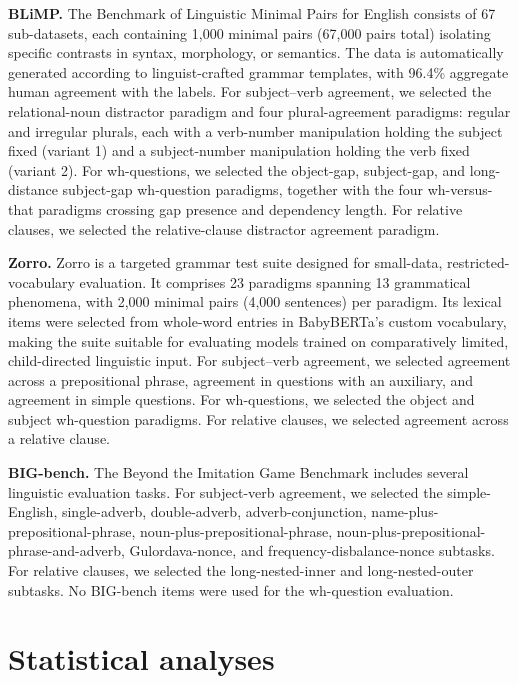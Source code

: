 \textbf{BLiMP.} The Benchmark of Linguistic Minimal Pairs for English \citep{warstadt2020blimp} consists of 67 sub-datasets, each containing 1,000 minimal pairs (67,000 pairs total) isolating specific contrasts in syntax, morphology, or semantics. The data is automatically generated according to linguist-crafted grammar templates, with 96.4\% aggregate human agreement with the labels. For subject--verb agreement, we selected the relational-noun distractor paradigm and four plural-agreement paradigms: regular and irregular plurals, each with a verb-number manipulation holding the subject fixed (variant 1) and a subject-number manipulation holding the verb fixed (variant 2). For wh-questions, we selected the object-gap, subject-gap, and long-distance subject-gap wh-question paradigms, together with the four wh-versus-that paradigms crossing gap presence and dependency length. For relative clauses, we selected the relative-clause distractor agreement paradigm.

 
\textbf{Zorro.} Zorro \citep{huebner2021babyberta} is a targeted grammar test suite designed for small-data, restricted-vocabulary evaluation. It comprises 23 paradigms spanning 13 grammatical phenomena, with 2,000 minimal pairs (4,000 sentences) per paradigm. Its lexical items were selected from whole-word entries in BabyBERTa's custom vocabulary, making the suite suitable for evaluating models trained on comparatively limited, child-directed linguistic input. For subject--verb agreement, we selected agreement across a prepositional phrase, agreement in questions with an auxiliary, and agreement in simple questions. For wh-questions, we selected the object and subject wh-question paradigms. For relative clauses, we selected agreement across a relative clause.


\textbf{BIG-bench.} The Beyond the Imitation Game Benchmark \citep{srivastava2023beyond} includes several linguistic evaluation tasks. For subject-verb agreement, we selected the simple-English, single-adverb, double-adverb, adverb-conjunction, name-plus-prepositional-phrase, noun-plus-prepositional-phrase, noun-plus-prepositional-phrase-\allowbreak and-adverb, Gulordava-nonce, and frequency-disbalance-nonce subtasks. For relative clauses, we selected the long-nested-inner and long-nested-outer subtasks. No BIG-bench items were used for the wh-question evaluation.


\section{Statistical analyses}
\label{app:stats}

